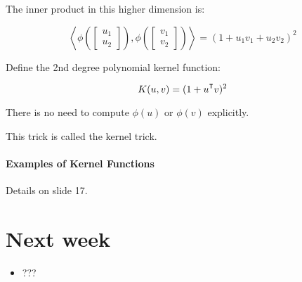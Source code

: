 \documentclass{idc_msc}
\renewcommand{\T}{{\mathpalette\raiseT\intercal}} %
\begin{document}
The inner product in this higher dimension is:

\[
\left\langle
\phi \left(\begin{bmatrix}u_1 \\ u_2\end{bmatrix}\right),
\phi \left(\begin{bmatrix}v_1 \\ v_2\end{bmatrix}\right)
\right\rangle =
(1 + u_1v_1 + u_2v_2)^2
\]

Define the 2nd degree polynomial kernel function:

\[K(u,v) = (1 + u^\T v)^2\]

There is no need to compute \(\phi(u)\) or \(\phi(v)\) explicitly.

This trick is called the kernel trick.

\paragraph{Examples of Kernel Functions}

Details on slide 17.

\section{Next week}

\begin{itemize}
  \item ???
\end{itemize}
\end{document}
